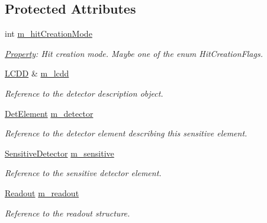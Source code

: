 \subsection*{Protected Attributes}
\begin{DoxyCompactItemize}
\item 
int \hyperlink{class_d_d4hep_1_1_simulation_1_1_geant4_sensitive_a0dca1438c83ccee54eb9458bf12220b1}{m\+\_\+hit\+Creation\+Mode}
\begin{DoxyCompactList}\small\item\em \hyperlink{class_d_d4hep_1_1_property}{Property}\+: Hit creation mode. Maybe one of the enum Hit\+Creation\+Flags. \end{DoxyCompactList}\item 
\hyperlink{class_d_d4hep_1_1_simulation_1_1_geant4_sensitive_a3373caa6917867ca7c871df20fb467c8}{L\+C\+DD} \& \hyperlink{class_d_d4hep_1_1_simulation_1_1_geant4_sensitive_af7bcfc4733d5822cb9d4b0852b121800}{m\+\_\+lcdd}
\begin{DoxyCompactList}\small\item\em Reference to the detector description object. \end{DoxyCompactList}\item 
\hyperlink{class_d_d4hep_1_1_simulation_1_1_geant4_sensitive_a1cb1af5fb1194be1e1c1137f1e54272b}{Det\+Element} \hyperlink{class_d_d4hep_1_1_simulation_1_1_geant4_sensitive_a8b5b7e0dff9d8fcb154b646e1618821f}{m\+\_\+detector}
\begin{DoxyCompactList}\small\item\em Reference to the detector element describing this sensitive element. \end{DoxyCompactList}\item 
\hyperlink{class_d_d4hep_1_1_simulation_1_1_geant4_sensitive_a985a23f6592b3ab41b9aa45e47fbc9ea}{Sensitive\+Detector} \hyperlink{class_d_d4hep_1_1_simulation_1_1_geant4_sensitive_a02ba3b720aadf6e230b6c2c0cd258b2b}{m\+\_\+sensitive}
\begin{DoxyCompactList}\small\item\em Reference to the sensitive detector element. \end{DoxyCompactList}\item 
\hyperlink{class_d_d4hep_1_1_simulation_1_1_geant4_sensitive_a2dc0e9ab41aeebbb0bad179419eeac72}{Readout} \hyperlink{class_d_d4hep_1_1_simulation_1_1_geant4_sensitive_a14b5d00feae681d434df04c0d9fc8f70}{m\+\_\+readout}
\begin{DoxyCompactList}\small\item\em Reference to the readout structure. \end{DoxyCompactList}\item 

\end{DoxyCompactItemize}
